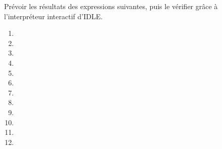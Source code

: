 Prévoir les résultats des expressions suivantes, puis le vérifier grâce à l'interpréteur interactif d'IDLE.

  \begin{enumerate}[label=\emph{\alph*)}]
    \item {}
    \item {}
    \item {}
    \item {}
    \item {}
    \item {}
    \item {}
    \item {}
    \item {}
    \item {}
    \item {}
    \item {}
  \end{enumerate}
